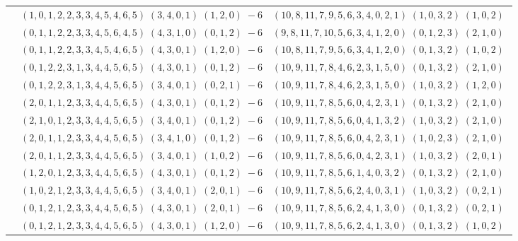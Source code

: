 \documentclass[11pt]{article}
\begin{document}
\begin{longtable}[l]{|c|c|c|}
 \cline{2-3} 
 & $(1 ,0 ,1 ,2 ,2 ,3 ,3 ,4 ,5 ,4 ,6 ,5) \;(3 ,4 ,0 ,1) \;(1 ,2 ,0) \;-6$ & $(10 ,8 ,11 ,7 ,9 ,5 ,6 ,3 ,4 ,0 ,2 ,1) \;(1 ,0 ,3 ,2) \;(1 ,0 ,2) \;$\\ 
 \cline{2-3} 
 & $(0 ,1 ,1 ,2 ,2 ,3 ,3 ,4 ,5 ,6 ,4 ,5) \;(4 ,3 ,1 ,0) \;(0 ,1 ,2) \;-6$ & $(9 ,8 ,11 ,7 ,10 ,5 ,6 ,3 ,4 ,1 ,2 ,0) \;(0 ,1 ,2 ,3) \;(2 ,1 ,0) \;$\\ 
 \cline{2-3} 
 & $(0 ,1 ,1 ,2 ,2 ,3 ,3 ,4 ,5 ,4 ,6 ,5) \;(4 ,3 ,0 ,1) \;(1 ,2 ,0) \;-6$ & $(10 ,8 ,11 ,7 ,9 ,5 ,6 ,3 ,4 ,1 ,2 ,0) \;(0 ,1 ,3 ,2) \;(1 ,0 ,2) \;$\\ 
 \cline{2-3} 
 & $(0 ,1 ,2 ,2 ,3 ,1 ,3 ,4 ,4 ,5 ,6 ,5) \;(4 ,3 ,0 ,1) \;(0 ,1 ,2) \;-6$ & $(10 ,9 ,11 ,7 ,8 ,4 ,6 ,2 ,3 ,1 ,5 ,0) \;(0 ,1 ,3 ,2) \;(2 ,1 ,0) \;$\\ 
 \cline{2-3} 
 & $(0 ,1 ,2 ,2 ,3 ,1 ,3 ,4 ,4 ,5 ,6 ,5) \;(3 ,4 ,0 ,1) \;(0 ,2 ,1) \;-6$ & $(10 ,9 ,11 ,7 ,8 ,4 ,6 ,2 ,3 ,1 ,5 ,0) \;(1 ,0 ,3 ,2) \;(1 ,2 ,0) \;$\\ 
 \cline{2-3} 
 & $(2 ,0 ,1 ,1 ,2 ,3 ,3 ,4 ,4 ,5 ,6 ,5) \;(4 ,3 ,0 ,1) \;(0 ,1 ,2) \;-6$ & $(10 ,9 ,11 ,7 ,8 ,5 ,6 ,0 ,4 ,2 ,3 ,1) \;(0 ,1 ,3 ,2) \;(2 ,1 ,0) \;$\\ 
 \cline{2-3} 
 & $(2 ,1 ,0 ,1 ,2 ,3 ,3 ,4 ,4 ,5 ,6 ,5) \;(3 ,4 ,0 ,1) \;(0 ,1 ,2) \;-6$ & $(10 ,9 ,11 ,7 ,8 ,5 ,6 ,0 ,4 ,1 ,3 ,2) \;(1 ,0 ,3 ,2) \;(2 ,1 ,0) \;$\\ 
 \cline{2-3} 
 & $(2 ,0 ,1 ,1 ,2 ,3 ,3 ,4 ,4 ,5 ,6 ,5) \;(3 ,4 ,1 ,0) \;(0 ,1 ,2) \;-6$ & $(10 ,9 ,11 ,7 ,8 ,5 ,6 ,0 ,4 ,2 ,3 ,1) \;(1 ,0 ,2 ,3) \;(2 ,1 ,0) \;$\\ 
 \cline{2-3} 
 & $(2 ,0 ,1 ,1 ,2 ,3 ,3 ,4 ,4 ,5 ,6 ,5) \;(3 ,4 ,0 ,1) \;(1 ,0 ,2) \;-6$ & $(10 ,9 ,11 ,7 ,8 ,5 ,6 ,0 ,4 ,2 ,3 ,1) \;(1 ,0 ,3 ,2) \;(2 ,0 ,1) \;$\\ 
 \cline{2-3} 
 & $(1 ,2 ,0 ,1 ,2 ,3 ,3 ,4 ,4 ,5 ,6 ,5) \;(4 ,3 ,0 ,1) \;(0 ,1 ,2) \;-6$ & $(10 ,9 ,11 ,7 ,8 ,5 ,6 ,1 ,4 ,0 ,3 ,2) \;(0 ,1 ,3 ,2) \;(2 ,1 ,0) \;$\\ 
 \cline{2-3} 
 & $(1 ,0 ,2 ,1 ,2 ,3 ,3 ,4 ,4 ,5 ,6 ,5) \;(3 ,4 ,0 ,1) \;(2 ,0 ,1) \;-6$ & $(10 ,9 ,11 ,7 ,8 ,5 ,6 ,2 ,4 ,0 ,3 ,1) \;(1 ,0 ,3 ,2) \;(0 ,2 ,1) \;$\\ 
 \cline{2-3} 
 & $(0 ,1 ,2 ,1 ,2 ,3 ,3 ,4 ,4 ,5 ,6 ,5) \;(4 ,3 ,0 ,1) \;(2 ,0 ,1) \;-6$ & $(10 ,9 ,11 ,7 ,8 ,5 ,6 ,2 ,4 ,1 ,3 ,0) \;(0 ,1 ,3 ,2) \;(0 ,2 ,1) \;$\\ 
 \cline{2-3} 
 & $(0 ,1 ,2 ,1 ,2 ,3 ,3 ,4 ,4 ,5 ,6 ,5) \;(4 ,3 ,0 ,1) \;(1 ,2 ,0) \;-6$ & $(10 ,9 ,11 ,7 ,8 ,5 ,6 ,2 ,4 ,1 ,3 ,0) \;(0 ,1 ,3 ,2) \;(1 ,0 ,2) \;$\\ 

\end{longtable}
\end{document}
